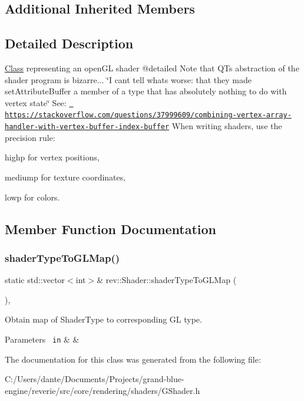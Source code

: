 \subsection*{Additional Inherited Members}


\subsection{Detailed Description}
\mbox{\hyperlink{struct_class}{Class}} representing an open\+GL shader @detailed Note that QT\textquotesingle{}s abstraction of the shader program is bizarre... \char`\"{}\+I can\textquotesingle{}t tell what\textquotesingle{}s worse\+: 
that they made set\+Attribute\+Buffer a member of a type that has absolutely nothing to do with vertex state\char`\"{} See\+: \href{https://stackoverflow.com/questions/37999609/combining-vertex-array-handler-with-vertex-buffer-index-buffer}{\texttt{ https\+://stackoverflow.\+com/questions/37999609/combining-\/vertex-\/array-\/handler-\/with-\/vertex-\/buffer-\/index-\/buffer}} When writing shaders, use the precision rule\+: 


\begin{DoxyItemize}
\item highp for vertex positions,
\item mediump for texture coordinates,
\item lowp for colors. 
\end{DoxyItemize}

\subsection{Member Function Documentation}
\mbox{\label{classrev_1_1_shader_a5860cf399e4686718d5d6e1350778688}} 
\subsubsection{\texorpdfstring{shaderTypeToGLMap()}{shaderTypeToGLMap()}}
{\footnotesize\ttfamily static std\+::vector$<$int$>$\& rev\+::\+Shader\+::shader\+Type\+To\+G\+L\+Map (\begin{DoxyParamCaption}{ }\end{DoxyParamCaption})\hspace{0.3cm}{\ttfamily [inline]}, {\ttfamily [static]}}



Obtain map of Shader\+Type to corresponding GL type. 


\begin{DoxyParams}[1]{Parameters}
\mbox{\texttt{ in}}  & {\em } & \\
\hline
\end{DoxyParams}


The documentation for this class was generated from the following file\+:\begin{DoxyCompactItemize}
\item 
C\+:/\+Users/dante/\+Documents/\+Projects/grand-\/blue-\/engine/reverie/src/core/rendering/shaders/G\+Shader.\+h\end{DoxyCompactItemize}
